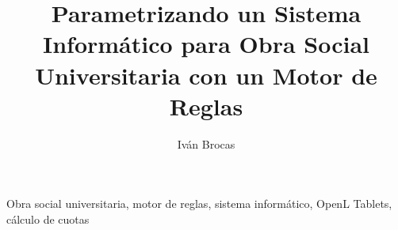 \documentclass[12pt,a4paper,spanish,twocolumn]{article}
\title{Parametrizando un Sistema Informático para Obra Social Universitaria con un Motor de Reglas}
\author{Iván Brocas}
\begin{document}
    \thistitle

    \justifying
    

    \begin{keywords}
    Obra social universitaria, motor de reglas, sistema informático, OpenL Tablets, cálculo de cuotas
    \end{keywords}

    

    

    

    

    

    

    

    

    

    \printbibliography

    
\end{document}
